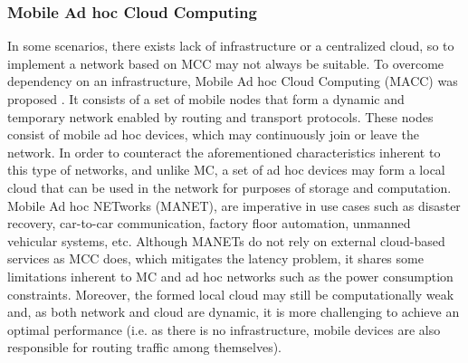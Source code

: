 \subsubsection{Mobile Ad hoc Cloud Computing}
\noindent In some scenarios, there exists lack of infrastructure or a centralized cloud, so to implement a network based on MCC may not always be suitable. To overcome dependency on an infrastructure, Mobile Ad hoc Cloud Computing (MACC) was proposed \cite{hubaux2001toward}. It consists of a set of mobile nodes that form a dynamic and temporary network enabled by routing and transport protocols. These nodes consist of mobile ad hoc devices, which may continuously join or leave the network. In order to counteract the aforementioned characteristics inherent to this type of networks, and unlike MC, a set of ad hoc devices may form a local cloud that can be used in the network for purposes of storage and computation. Mobile Ad hoc NETworks (MANET), are imperative in use cases such as disaster recovery, car-to-car communication, factory floor automation, unmanned vehicular systems, etc. Although MANETs do not rely on external cloud-based services as MCC does, which mitigates the latency problem, it shares some limitations inherent to MC and ad hoc networks such as the power consumption constraints. Moreover, the formed local cloud may still be computationally weak and, as both network and cloud are dynamic, it is more challenging to achieve an optimal performance (i.e. as there is no infrastructure, mobile devices are also responsible for routing traffic among themselves).

